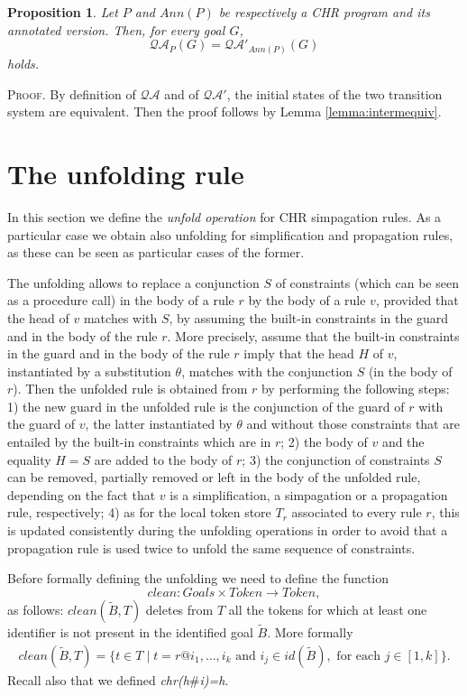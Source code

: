 \documentclass[final]{acmtrans2e}
\newtheorem{proposition}[theorem]{Proposition}
\begin{document}
\begin{proposition}\label{lemma:nequality}
Let $P$ and $Ann(P)$ be respectively a CHR program and its annotated version.
Then, for every goal $G$,
$$\mathcal{QA}_{P}(G) = \mathcal{QA'}_{Ann(P)}(G)$$
holds.
\end{proposition}
\textsc{Proof.} By definition of $\mathcal{QA}$ and of $\mathcal{QA'}$,
the initial states of the two transition system are equivalent. Then the proof follows by Lemma \ref{lemma:intermequiv}.

\section{The unfolding rule}\label{sec:unfolding}


In this section we define the \emph{unfold operation} for CHR
simpagation rules. As a particular case we obtain also
unfolding for  simplification and propagation rules, as these can
be seen as particular cases of the former.

The unfolding allows to replace  a  conjunction $S$ of constraints
(which can be seen as a procedure call) in the body of a rule $r$
by the body of a rule  $v$,  provided that the head of $v$ matches
with $S$, by assuming the built-in constraints in
the guard and in the body of the rule $r$. More precisely, assume that
the built-in constraints in the guard and in the body
of the rule $r$ imply that the head $H$ of $v$,
instantiated by a substitution $\theta$, matches with the
conjunction $S$  (in the body of  $r$). Then the unfolded rule is
obtained from $r$ by performing the following steps:  1) the new
guard in the unfolded rule is the conjunction of the guard of $r$
with the guard of $v$, the latter instantiated by $\theta$ and
without  those constraints that are entailed by the built-in
constraints which are in $r$; 2) the body of $v$ and the equality
$H = S$ are added to the body of $r$; 3) the conjunction of constraints $S$ can
be removed, partially removed or left in the body of  the unfolded
rule, depending on the fact that $v$ is a simplification, a
simpagation or a propagation rule, respectively; 4) as for the
local token store  $T_r$ associated to every rule $r$, this is
updated consistently during the unfolding operations in order to
avoid that a propagation rule is used twice to unfold the same
sequence of constraints.


Before formally defining the unfolding we need to define the
function \[clean: Goals \times Token \rightarrow Token,\] as
follows: $clean (\tilde B,T)$ deletes from $T$ all the tokens for
which at least one identifier is not present in the identified
goal $\tilde B$. More formally
$$\begin{array}{l}
        clean(\tilde B, T)= \{t\in T\mid  t=r@i_1, \ldots, i_k \mbox{ and }
        i_j\in id(\tilde B), \mbox{ for each } j \in [1,k]\}.
\end{array}
$$
Recall also that we defined  {\em chr(h$\#$i)=h}.
\end{document}
